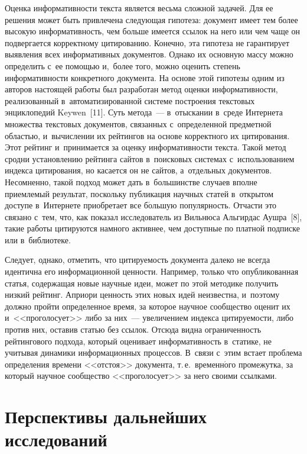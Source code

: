 \begin{multicols}{2}
   Оценка информативности текста является весьма сложной задачей. Для ее
решения может быть привлечена следующая гипотеза: документ имеет тем
более высокую информативность, чем больше имеется ссылок на него или
чем чаще он подвергается корректному цитированию. Конечно, эта гипотеза
не гарантирует выявления всех информативных документов. Однако их
основную массу можно определить с~ее помощью и,~более того, можно
оценить степень информативности конкретного документа. На основе этой
гипотезы одним из авторов настоящей работы был разработан метод оценки
информативности, реализованный в~автоматизированной системе
построения текстовых энциклопедий Keywen~[11]. Суть метода~---
в~отыскании в~среде Интернета множества текстовых документов,
связанных с~определенной предметной областью, и~вычислении их
рейтингов на основе корректного их цитирования. Этот рейтинг
и~принимается за оценку информативности текста. Такой метод сродни
установлению рейтинга сайтов в~поисковых системах с~использованием
индекса цитирования, но касается он не сайтов, а~отдельных документов.
Несомненно, такой подход может дать в~большинстве случаев вполне
приемлемый результат, поскольку публикация научных статей в~открытом
доступе в~Интернете приобретает все б$\acute{\mbox{о}}$льшую популярность. Отчасти это
связано с~тем, что, как показал исследователь из Вильнюса Альгирдас
Аушра~[8], такие работы цитируются намного активнее, чем доступные по
платной подписке или в~библиотеке.

   Следует, однако, отметить, что цитируемость документа далеко не всегда
идентична его информационной ценности. Например, только что
опуб\-ли\-ко\-ван\-ная статья, содержащая новые научные идеи, может по этой
методике получить низкий рейтинг. Априори ценность этих новых идей
неизвестна, и~поэтому должно пройти определенное время, за которое
научное сообщество оценит их и~<<проголосует>> либо за них~---
увеличением индекса цитируемости, либо против них, оставив статью без
ссылок. Отсюда видна ограниченность рейтингового подхода, который
оценивает информативность в~статике, не учитывая динамики
информационных процессов. В~связи с~этим встает проблема определения
времени <<отстоя>> документа, т.\,е.\ временн$\acute{\mbox{о}}$го промежутка, за который
научное сообщество <<проголосует>> за него своими ссылками.

\vspace*{-6pt}

\section{Перспективы дальнейших исследований}


\end{multicols}
